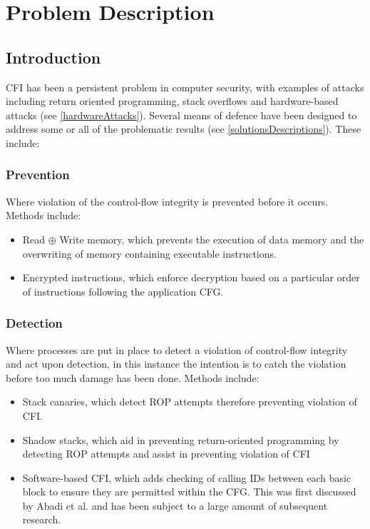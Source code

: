 \section{Problem Description}
\subsection{Introduction}

CFI has been a persistent problem in computer security, with examples of attacks including return oriented programming, stack overflows and hardware-based attacks (see \ref{hardwareAttacks}). Several means of defence have been designed to address some or all of the problematic results (see \ref{solutionsDescriptions}). These include:

\subsubsection*{Prevention}
Where violation of the control-flow integrity is prevented before it occurs. Methods include:
\begin{itemize}
	\item Read $\oplus$ Write memory, which prevents the execution of data memory and the overwriting of memory containing executable instructions.
	\item Encrypted instructions, which enforce decryption based on a particular order of instructions following the application CFG.
\end{itemize}

\subsubsection*{Detection}
Where processes are put in place to detect a violation of control-flow integrity and act upon detection, in this instance the intention is to catch the violation before too much damage has been done. Methods include:
\begin{itemize}
	\item Stack canaries, which detect ROP attempts therefore preventing violation of CFI.
	\item Shadow stacks, which aid in preventing return-oriented programming by detecting ROP attempts and assist in preventing violation of CFI
	\item Software-based CFI, which adds checking of calling IDs between each basic block to ensure they are permitted within the CFG. This was first discussed by Abadi et al. \cite{Abadi2005} and has been subject to a large amount of subsequent research.
\end{itemize}

